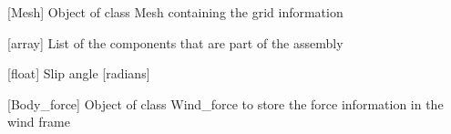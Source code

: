 \documentclass[letterpaper,10pt,english]{sphinxmanual}
\begin{document}
\begin{fulllineitems}
\begin{fulllineitems}
\label{\detokenize{modules:assembly.Assembly.mesh}}
\pysigstartsignatures
{}
\pysigstopsignatures
\sphinxAtStartPar
{[}Mesh{]} Object of class Mesh containing the grid information

\end{fulllineitems}


\begin{fulllineitems}
\label{\detokenize{modules:assembly.Assembly.objects}}
\pysigstartsignatures
{}
\pysigstopsignatures
\sphinxAtStartPar
{[}array{]} List of the components that are part of the assembly

\end{fulllineitems}


\begin{fulllineitems}
\label{\detokenize{modules:assembly.Assembly.slip}}
\pysigstartsignatures
{}
\pysigstopsignatures
\sphinxAtStartPar
{[}float{]} Slip angle {[}radians{]}

\end{fulllineitems}


\begin{fulllineitems}
\label{\detokenize{modules:assembly.Assembly.wind_force}}
\pysigstartsignatures
{}
\pysigstopsignatures
\sphinxAtStartPar
{[}Body\_force{]} Object of class Wind\_force to store the force information in the wind frame

\end{fulllineitems}


\end{fulllineitems}

\end{document}
